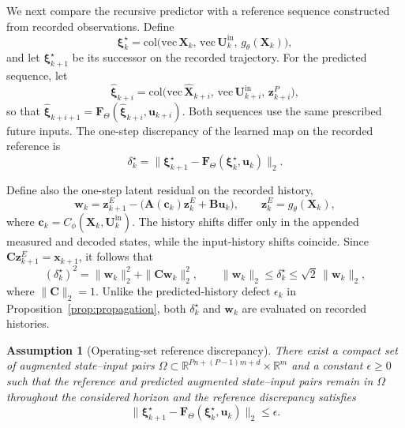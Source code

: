 \documentclass[journal]{IEEEtran}
\newtheorem{assumption}{Assumption}
\newcommand{\vx}{\mathbf{x}}
\newcommand{\vu}{\mathbf{u}}
\newcommand{\vz}{\mathbf{z}}
\newcommand{\vw}{\mathbf{w}}
\newcommand{\mA}{\mathbf{A}}
\newcommand{\mB}{\mathbf{B}}
\newcommand{\mC}{\mathbf{C}}
\newcommand{\mX}{\mathbf{X}}
\newcommand{\mU}{\mathbf{U}}
\newcommand{\vc}{\mathbf{c}}
\newcommand{\vxi}{\boldsymbol{\xi}}
\newcommand{\mF}{\mathbf{F}}
\begin{document}
We next compare the recursive predictor with a reference sequence constructed from recorded observations. Define
\begin{equation}
    \vxi^{\star}_k=\mathrm{col}\big(\mathrm{vec}\,\mX_k,\,\mathrm{vec}\,\mU^{\mathrm{in}}_k,\,g_\theta(\mX_k)\big),
    \label{eq:true_augmented}
\end{equation}
and let \(\vxi^\star_{k+1}\) be its successor on the recorded trajectory. For the predicted sequence, let
\[
    \hat{\vxi}_{k+i}=\mathrm{col}\big(
        \mathrm{vec}\,\hat{\mX}_{k+i},\,
        \mathrm{vec}\,\mU^{\mathrm{in}}_{k+i},\,
        \vz^P_{k+i}\big),
\]
so that \(\hat{\vxi}_{k+i+1}=\mF_\Theta(\hat{\vxi}_{k+i},\vu_{k+i})\). Both sequences use the same prescribed future inputs. The one-step discrepancy of the learned map on the recorded reference is
\begin{equation}
    \delta^{\star}_k=\big\|\vxi^{\star}_{k+1}-\mF_\Theta(\vxi^{\star}_k,\vu_k)\big\|_2 .
    \label{eq:ref_discrepancy}
\end{equation}

Define also the one-step latent residual on the recorded history,
\begin{equation}
    \vw_k = \vz^{E}_{k+1} - \big(\mA(\vc_k)\vz^{E}_k + \mB \vu_k\big),
    \qquad \vz^{E}_{k}=g_\theta(\mX_k),
    \label{eq:modeling_error}
\end{equation}
where \(\vc_k=C_\phi(\mX_k,\mU_k^{\mathrm{in}})\). The history shifts differ only in the appended measured and decoded states, while the input-history shifts coincide. Since \(\mC\vz^E_{k+1}=\vx_{k+1}\), it follows that
\begin{equation}
    (\delta^{\star}_k)^2=\|\vw_k\|_2^2+\|\mC\vw_k\|_2^2 ,
    \qquad
    \|\vw_k\|_2\le\delta^{\star}_k\le\sqrt{2}\,\|\vw_k\|_2 ,
    \label{eq:w_delta_relation}
\end{equation}
where \(\|\mC\|_2=1\). Unlike the predicted-history defect \(\epsilon_k\) in Proposition~\ref{prop:propagation}, both \(\delta_k^\star\) and \(\vw_k\) are evaluated on recorded histories.

\begin{assumption}[Operating-set reference discrepancy]
\label{as:mismatch}
There exist a compact set of augmented state--input pairs
\(\Omega\subset\mathbb{R}^{Pn+(P-1)m+d}\times\mathbb{R}^m\)
and a constant \(\epsilon\ge0\) such that the reference and predicted augmented state--input pairs remain in \(\Omega\) throughout the considered horizon and the reference discrepancy satisfies
\begin{equation}
    \big\|\vxi^{\star}_{k+1}-\mF_\Theta(\vxi^{\star}_k,\vu_k)\big\|_2\le\epsilon .
    \label{eq:as_mismatch}
\end{equation}
\end{assumption}
\end{document}
